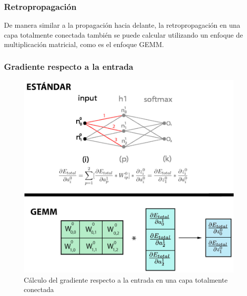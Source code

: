 \newpage

\subsubsection{Retropropagación}

De manera similar a la propagación hacia delante, la retropropagación en una capa totalmente conectada también se puede calcular utilizando un enfoque de multiplicación matricial, como es el enfoque GEMM.

\subsubsection{Gradiente respecto a la entrada}
\begin{figure}[H]
	\centering
	\includegraphics[scale=0.35]{imagenes/gemm_fully_back_input.jpg}  
	\caption{Cálculo del gradiente respecto a la entrada en una capa totalmente conectada}
	\label{fig:gemm_fully_back_input}
\end{figure}


